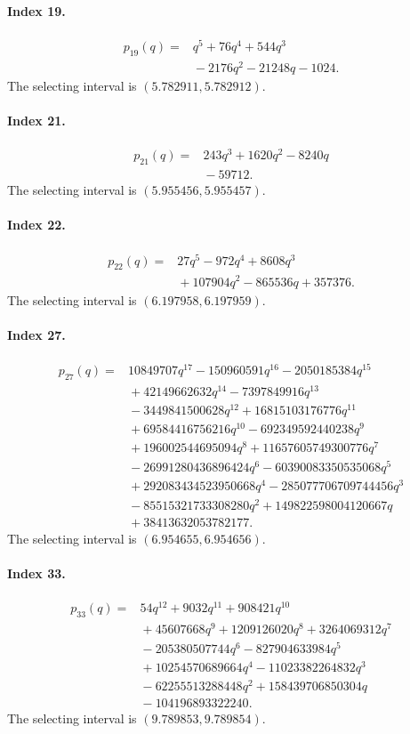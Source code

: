 \paragraph{Index 19.}
\begin{align*}
p_{19}(q)={}&q^{5} + 76 q^{4} + 544 q^{3}\\
&{}- 2176 q^{2} -  21248 q - 1024.
\end{align*}
The selecting interval is $(5.782911,5.782912)$.
\paragraph{Index 21.}
\begin{align*}
p_{21}(q)={}&243 q^{3} + 1620 q^{2} -  8240 q\\
&{}-59712.
\end{align*}
The selecting interval is $(5.955456,5.955457)$.
\paragraph{Index 22.}
\begin{align*}
p_{22}(q)={}&27 q^{5} -  972 q^{4} + 8608 q^{3}\\
&{}+ 107904 q^{2} -  865536 q + 357376.
\end{align*}
The selecting interval is $(6.197958,6.197959)$.
\paragraph{Index 27.}
\begin{align*}
p_{27}(q)={}&10849707 q^{17} -  150960591 q^{16} -  2050185384 q^{15}\\
&{}+ 42149662632 q^{14} -  7397849916 q^{13}\\
&{}- 3449841500628 q^{12} + 16815103176776 q^{11}\\
&{}+ 69584416756216 q^{10} -  692349592440238 q^{9}\\
&{}+ 196002544695094 q^{8} + 11657605749300776 q^{7}\\
&{}- 26991280436896424 q^{6} -  60390083350535068 q^{5}\\
&{}+ 292083434523950668 q^{4} -  285077706709744456 q^{3}\\
&{}- 85515321733308280 q^{2} + 149822598004120667 q\\
&{}+ 38413632053782177.
\end{align*}
The selecting interval is $(6.954655,6.954656)$.
\paragraph{Index 33.}
\begin{align*}
p_{33}(q)={}&54 q^{12} + 9032 q^{11} + 908421 q^{10}\\
&{}+ 45607668 q^{9} + 1209126020 q^{8} + 3264069312 q^{7}\\
&{}- 205380507744 q^{6} -  827904633984 q^{5}\\
&{}+ 10254570689664 q^{4} -  11023382264832 q^{3}\\
&{}- 62255513288448 q^{2} + 158439706850304 q\\
&{}-104196893322240.
\end{align*}
The selecting interval is $(9.789853,9.789854)$.
